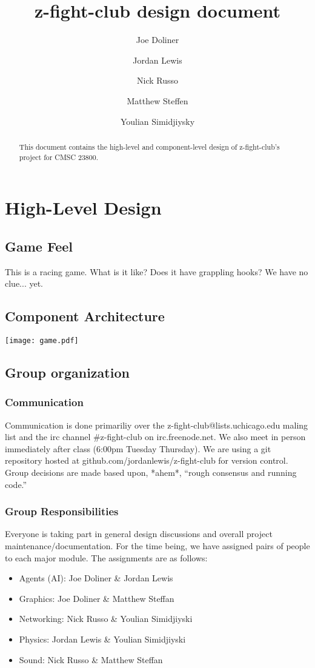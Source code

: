 \documentclass[12pt]{article}
\title{z-fight-club design document}
\author{Joe Doliner \and Jordan Lewis \and Nick Russo \and Matthew Steffen \and Youlian Simidjiysky}
\begin{document}
 \maketitle
\begin{abstract}
This document contains the high-level and component-level design of
z-fight-club's project for CMSC 23800.
\end{abstract}
\section{High-Level Design}
\subsection{Game Feel}
This is a racing game. What is it like? Does it have grappling hooks?  We have no clue... yet.
\subsection{Component Architecture}
\texttt{[image: game.pdf]}

\subsection{Group organization}
\subsubsection{Communication}
Communication is done primariliy over the z-fight-club@lists.uchicago.edu maling list and the irc channel \#z-fight-club on irc.freenode.net.  We also meet in person immediately after class (6:00pm Tuesday Thursday).  We are using a git repository hosted at github.com/jordanlewis/z-fight-club for version control.  Group decisions are made based upon, *ahem*, ``rough consensus and running code.''
\subsubsection{Group Responsibilities}
Everyone is taking part in general design discussions and overall project maintenance/documentation.  For the time being, we have assigned pairs of people to each major module.  The assignments are as follows:
\begin{itemize}
\item Agents (AI):  Joe Doliner \& Jordan Lewis
\item Graphics:  Joe Doliner \& Matthew Steffan
\item Networking:  Nick Russo \& Youlian Simidjiyski 
\item Physics:  Jordan Lewis \& Youlian Simidjiyski
\item Sound:  Nick Russo \& Matthew Steffan
\end{itemize}
\end{document}
